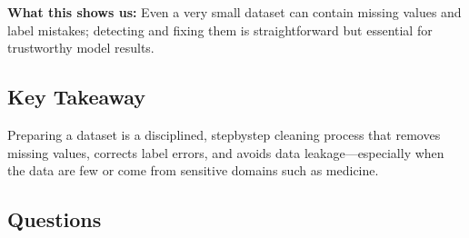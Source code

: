 \documentclass[12pt, a4paper]{article}
\begin{document}
\textbf{What this shows us:}  
Even a very small dataset can contain missing values and label mistakes; detecting and fixing them is straightforward but essential for trustworthy model results.  

\subsection{Key Takeaway}
Preparing a dataset is a disciplined, stepbystep cleaning process that removes missing values, corrects label errors, and avoids data leakage---especially when the data are few or come from sensitive domains such as medicine.

\subsection*{Questions}
\end{document}
